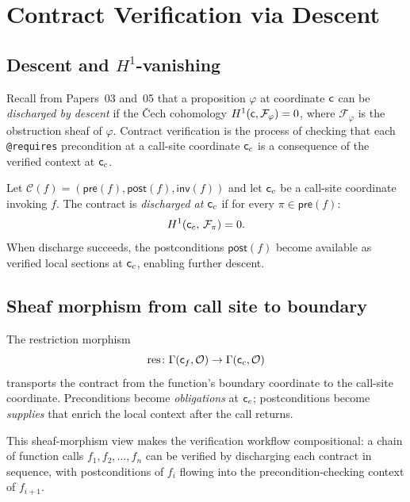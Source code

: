 \documentclass[11pt]{article}
\newcommand{\ContractOf}[1]{\mathcal{C}(#1)}  %
\newcommand{\Pre}{\mathsf{pre}}            %
\newcommand{\Post}{\mathsf{post}}          %
\newcommand{\Inv}{\mathsf{inv}}            %
\begin{document}
\section{Contract Verification via Descent}\label{sec:verification}

\subsection{Descent and $H^1$-vanishing}

Recall from Papers~03 and~05 that a proposition $\varphi$ at coordinate
$\mathsf{c}$ can be \emph{discharged by descent} if the \v{C}ech cohomology
$H^{1}(\mathsf{c}, \mathcal{F}_\varphi) = 0$, where $\mathcal{F}_\varphi$
is the obstruction sheaf of $\varphi$.  Contract verification is the
process of checking that each \texttt{@requires} precondition at a
call-site coordinate $\mathsf{c}_c$ is a consequence of the verified context
at $\mathsf{c}_c$.

\begin{definition}\label{def:discharge}
Let $\ContractOf{f} = (\Pre(f), \Post(f), \Inv(f))$ and let
$\mathsf{c}_c$ be a call-site coordinate invoking $f$.  The contract is
\emph{discharged at $\mathsf{c}_c$} if for every $\pi \in \Pre(f)$:
\[
  H^{1}(\mathsf{c}_c,\, \mathcal{F}_\pi) = 0.
\]
When discharge succeeds, the postconditions $\Post(f)$ become available
as verified local sections at $\mathsf{c}_c$, enabling further descent.
\end{definition}

\subsection{Sheaf morphism from call site to boundary}

The restriction morphism
\[
  \mathrm{res}\colon \Gamma(\mathsf{c}_f, \mathcal{O}) \to \Gamma(\mathsf{c}_c, \mathcal{O})
\]
transports the contract from the function's boundary coordinate to the
call-site coordinate.  Preconditions become \emph{obligations} at
$\mathsf{c}_c$; postconditions become \emph{supplies} that enrich the local
context after the call returns.

This sheaf-morphism view makes the verification workflow compositional:
a chain of function calls $f_1, f_2, \ldots, f_n$ can be verified by
discharging each contract in sequence, with postconditions of $f_i$
flowing into the precondition-checking context of $f_{i+1}$.
\end{document}
